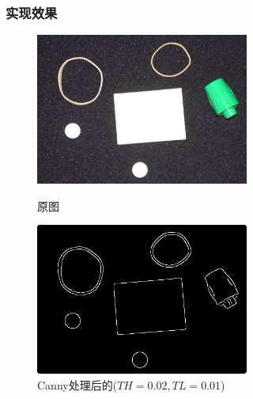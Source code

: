 \documentclass[11pt, a4paper, UTF8]{ctexart}
\begin{document}
\subsubsection{实现效果}
\begin{figure}[H]
  \centering
  \begin{minipage}[t]{0.48\textwidth}
  \centering
  \includegraphics[width=7cm]{rubberband_cap.png}
  \caption{原图}
  \end{minipage}
  \begin{minipage}[t]{0.48\textwidth}
  \centering
  \includegraphics[width=7cm]{Canny_TH=0.02_TL=0.01_rubberband_cap.png}
  \caption{Canny处理后的($TH=0.02,TL=0.01$)}
  \end{minipage}
\end{figure}
\end{document}
